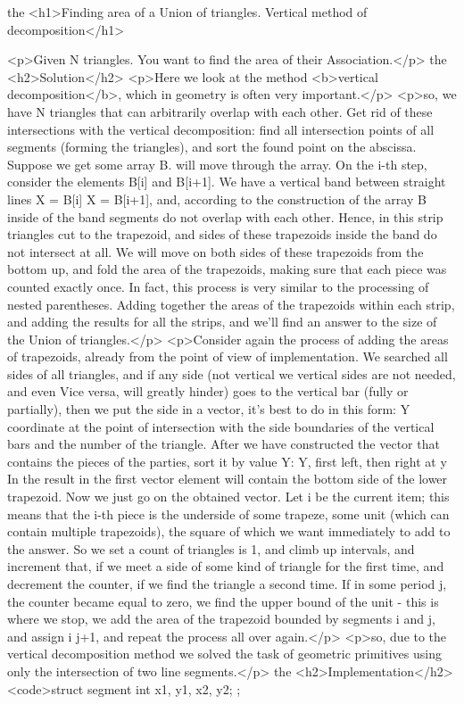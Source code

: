 the <h1>Finding area of a Union of triangles. Vertical method of decomposition</h1>

<p>Given N triangles. You want to find the area of their Association.</p>
the <h2>Solution</h2>
<p>Here we look at the method <b>vertical decomposition</b>, which in geometry is often very important.</p>
<p>so, we have N triangles that can arbitrarily overlap with each other. Get rid of these intersections with the vertical decomposition: find all intersection points of all segments (forming the triangles), and sort the found point on the abscissa. Suppose we get some array B. will move through the array. On the i-th step, consider the elements B[i] and B[i+1]. We have a vertical band between straight lines X = B[i] X = B[i+1], and, according to the construction of the array B inside of the band segments do not overlap with each other. Hence, in this strip triangles cut to the trapezoid, and sides of these trapezoids inside the band do not intersect at all. We will move on both sides of these trapezoids from the bottom up, and fold the area of the trapezoids, making sure that each piece was counted exactly once. In fact, this process is very similar to the processing of nested parentheses. Adding together the areas of the trapezoids within each strip, and adding the results for all the strips, and we'll find an answer to the size of the Union of triangles.</p>
<p>Consider again the process of adding the areas of trapezoids, already from the point of view of implementation. We searched all sides of all triangles, and if any side (not vertical we vertical sides are not needed, and even Vice versa, will greatly hinder) goes to the vertical bar (fully or partially), then we put the side in a vector, it's best to do in this form: Y coordinate at the point of intersection with the side boundaries of the vertical bars and the number of the triangle. After we have constructed the vector that contains the pieces of the parties, sort it by value Y: Y, first left, then right at y In the result in the first vector element will contain the bottom side of the lower trapezoid. Now we just go on the obtained vector. Let i be the current item; this means that the i-th piece is the underside of some trapeze, some unit (which can contain multiple trapezoids), the square of which we want immediately to add to the answer. So we set a count of triangles is 1, and climb up intervals, and increment that, if we meet a side of some kind of triangle for the first time, and decrement the counter, if we find the triangle a second time. If in some period j, the counter became equal to zero, we find the upper bound of the unit - this is where we stop, we add the area of the trapezoid bounded by segments i and j, and assign i j+1, and repeat the process all over again.</p>
<p>so, due to the vertical decomposition method we solved the task of geometric primitives using only the intersection of two line segments.</p>
the <h2>Implementation</h2>
<code>struct segment {
int x1, y1, x2, y2;
};

